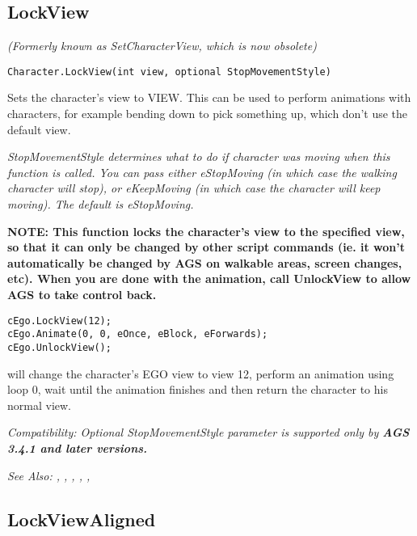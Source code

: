 \subsection{LockView}\label{Character.LockView}%

\it{(Formerly known as SetCharacterView, which is now obsolete)}

\begin{verbatim}
Character.LockView(int view, optional StopMovementStyle)
\end{verbatim}

Sets the character's view to VIEW. This can be used to perform animations
with characters, for example bending down to pick something up, which don't
use the default view.

\it{StopMovementStyle} determines what to do if character was moving when this function is called. You can pass either eStopMoving (in which case the walking character will stop), or eKeepMoving (in which case the character will keep moving). The default is eStopMoving.

\bf{NOTE:} This function locks the character's view to the specified view, so
that it can only be changed by other script commands (ie. it won't
automatically be changed by AGS on walkable areas, screen changes,
etc). When you are done with the animation, call UnlockView to allow AGS to
take control back.

\begin{verbatim}
cEgo.LockView(12);
cEgo.Animate(0, 0, eOnce, eBlock, eForwards);
cEgo.UnlockView();
\end{verbatim}
will change the character's EGO view to view 12, perform an animation using loop 0,
wait until the animation finishes and then return the character to his normal view.

\it{Compatibility:} Optional \it{StopMovementStyle} parameter is supported only by \bf{AGS 3.4.1} and later versions.

\it{See Also:} ,
,
,
,
,


\subsection{LockViewAligned}\label{Character.LockViewAligned}%

